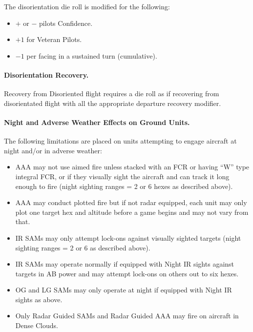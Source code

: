 \begin{advancedrules}
{The disorientation die roll is modified for the following:
\begin{itemize}
    \item $+$ or $-$ pilots Confidence.
    \item $+1$ for Veteran Pilots.
    \item $-1$ per facing in a sustained turn (cumulative).
\end{itemize}

\paragraph{Disorientation Recovery.} Recovery from Disoriented flight requires a die roll as if recovering from disorientated flight with all the appropriate departure recovery modifier.

\paragraph{Night and Adverse Weather Effects on Ground Units.} The following limitations are placed on units attempting to engage aircraft at night and/or in adverse weather:

\begin{itemize}

    \item AAA may not use aimed fire unless stacked with an FCR or having “W” type integral FCR, or if they visually sight the aircraft and can track it long enough to fire (night sighting ranges = 2 or 6 hexes as described above).

    \item AAA may conduct plotted fire but if not radar equipped, each unit may only plot one target hex and altitude before a game begins and may not vary from that.

    \item IR SAMs may only attempt lock-ons against visually sighted targets (night sighting ranges = 2 or 6 as described above).

    \item IR SAMs may operate normally if equipped with Night IR sights against targets in AB power and may attempt lock-ons on others out to six hexes.

    \item OG and LG SAMs may only operate at night if equipped with Night IR sights as above.

    \item Only Radar Guided SAMs and Radar Guided AAA may fire on aircraft in Dense Clouds.


\end{itemize}}
\end{advancedrules}
